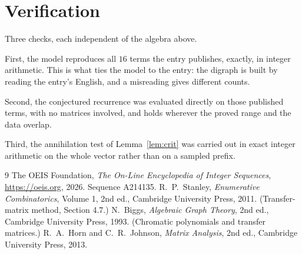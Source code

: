 \documentclass[11pt,a4paper]{article}
\theoremstyle{plain}
\theoremstyle{definition}
\begin{document}
\section{Verification}

Three checks, each independent of the algebra above.

First, the model reproduces all $16$ terms the entry publishes, exactly, in integer
arithmetic. This is what ties the model to the entry: the digraph is built by reading the
entry's English, and a misreading gives different counts.

Second, the conjectured recurrence was evaluated directly on those published terms, with no
matrices involved, and holds wherever the proved range and the data overlap.

Third, the annihilation test of Lemma~\ref{lem:crit} was carried out in exact integer
arithmetic on the whole vector rather than on a sampled prefix.

\begin{thebibliography}{9}
 The OEIS Foundation, \emph{The On-Line Encyclopedia of Integer
Sequences}, \url{https://oeis.org}, 2026. Sequence A214135.
 R.~P.~Stanley, \emph{Enumerative Combinatorics}, Volume 1, 2nd ed.,
Cambridge University Press, 2011. (Transfer-matrix method, Section 4.7.)
 N.~Biggs, \emph{Algebraic Graph Theory}, 2nd ed., Cambridge University
Press, 1993. (Chromatic polynomials and transfer matrices.)
 R.~A.~Horn and C.~R.~Johnson, \emph{Matrix Analysis}, 2nd ed., Cambridge
University Press, 2013.
\end{thebibliography}
\end{document}
